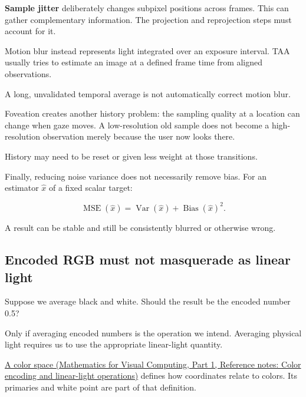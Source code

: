 \hypertarget{04-visual-computing-ii-ch042-jitter-taa-and-motion-blur-solve-different-problems}{}

\textbf{Sample jitter} deliberately changes subpixel positions across frames. This can gather complementary information. The projection and reprojection steps must account for it.

Motion blur instead represents light integrated over an exposure interval. TAA usually tries to estimate an image at a defined frame time from aligned observations.

A long, unvalidated temporal average is not automatically correct motion blur.

Foveation creates another history problem: the sampling quality at a location can change when gaze moves. A low-resolution old sample does not become a high-resolution observation merely because the user now looks there.

History may need to be reset or given less weight at those transitions.

Finally, reducing noise variance does not necessarily remove bias. For an estimator \(\hat x\) of a fixed scalar target:

\[
\operatorname{MSE}(\hat x)
=\operatorname{Var}(\hat x)+\operatorname{Bias}(\hat x)^2.
\]

A result can be stable and still be consistently blurred or otherwise wrong.

\subsection{Encoded RGB must not masquerade as linear light}\label{04-visual-computing-ii-ch042-encoded-rgb-must-not-masquerade-as-linear-light}

\hypertarget{04-visual-computing-ii-ch042-encoded-rgb-must-not-masquerade-as-linear-light}{}

Suppose we average black and white. Should the result be the encoded number 0.5?

Only if averaging encoded numbers is the operation we intend. Averaging physical light requires us to use the appropriate linear-light quantity.

\href{../02-Mathematics-for-Visual-Computing-P01/main.pdf\#nameddest=appendix-a9f83ad40792}{A color space (Mathematics for Visual Computing, Part 1, Reference notes: Color encoding and linear-light operations)} defines how coordinates relate to colors. Its primaries and white point are part of that definition.

